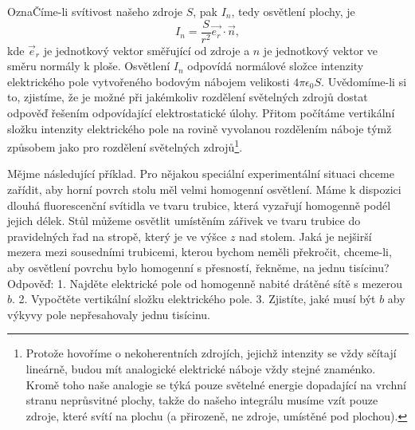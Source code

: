     OznaČíme-li svítivost našeho zdroje \(S\), pak \(I_n\), tedy osvětlení plochy, je
    \begin{equation*}
      I_n=\dfrac{S}{r^2}\vec{e_r}⋅\vec{n},
    \end{equation*}
    kde \(\vec{e}_r\) je jednotkový vektor směřující od zdroje a \(n\) je jednotkový vektor ve směru
    normály k ploše. Osvětlení \(I_n\) odpovídá normálové složce intenzity elektrického pole
    vytvořeného bodovým nábojem velikosti \(4πϵ_0S\). Uvědomíme-li si to, zjistíme, že je možné při
    jakémkoliv rozdělení světelných zdrojů dostat odpověď řešením odpovídající elektrostatické
    úlohy. Přitom počítáme vertikální složku intenzity elektrického pole na rovině vyvolanou
    rozdělením náboje týmž způsobem jako pro rozdělení světelných zdrojů\footnote{Protože hovoříme o
    nekoherentních zdrojích, jejichž intenzity se vždy sčítají lineárně, budou mít analogické
    elektrické náboje vždy stejné znaménko. Kromě toho naše analogie se týká pouze světelné energie
    dopadající na vrchní stranu neprůsvitné plochy, takže do našeho integrálu musíme vzít pouze
    zdroje, které svítí na plochu (a přirozeně, ne zdroje, umístěné pod plochou).}.

    Mějme následující příklad. Pro nějakou speciální experimentální situaci chceme zařídit, aby
    horní povrch stolu měl velmi homogenní osvětlení. Máme k dispozici dlouhá fluorescenční svítidla
    ve tvaru trubice, která vyzařují homogenně podél jejich délek. Stůl můžeme osvětlit umístěním
    zářivek ve tvaru trubice do pravidelných řad na stropě, který je ve výšce \(z\) nad stolem. Jaká
    je nejširší mezera mezi sousedními trubicemi, kterou bychom neměli překročit, chceme-li, aby
    osvětlení povrchu bylo homogenní s přesností, řekněme, na jednu tisícinu? Odpověď: 1. Najděte
    elektrické pole od homogenně nabité drátěné sítě s mezerou \(b\). 2. Vypočtěte vertikální složku
    elektrického pole. 3. Zjistíte, jaké musí být \(b\) aby výkyvy pole nepřesahovaly jednu
    tisícinu.

